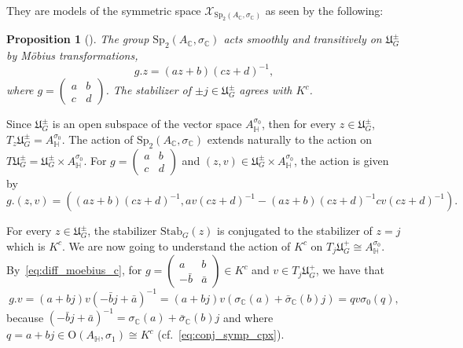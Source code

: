 \documentclass[oneside,11pt]{amsart}
\newtheorem{prop}[thm]{Proposition}
\theoremstyle{definition}
\theoremstyle{remark}
\numberwithin{thm}{section}
\numberwithin{equation}{section}
\begin{document}
\noindent They are models of the symmetric space  $\mathcal X_{\mathrm{Sp}_2(A_\mathbb{C},\sigma_\mathbb{C})}$ as seen by the following:

\begin{prop}[{\cite[Proposition~6.10]{ABRRW}}]
    The group $\mathrm{Sp}_2(A_\mathbb C,\sigma_\mathbb C)$ acts smoothly and transitively on $\mathfrak{U}_G^\pm$ by M\"obius transformations, 
    $$g.z=(az+b)(cz+d)^{-1},$$ 
    where $g=\begin{pmatrix}
        a & b \\
        c & d
    \end{pmatrix}$. The stabilizer of $\pm j\in\mathfrak{U}_G^\pm$ agrees with $K^c$.
\end{prop}

Since $\mathfrak{U}_G^\pm$ is an open subspace of the vector space $A_\mathbb{H}^{\sigma_0}$, then for every $z\in \mathfrak{U}_G^\pm$, $T_z\mathfrak{U}_G^\pm = A_\mathbb{H}^{\sigma_0}$.  The action of $\mathrm{Sp}_2(A_\mathbb C,\sigma_\mathbb C)$ extends naturally to the action on $T\mathfrak{U}_G^\pm=\mathfrak{U}_G^\pm\times A^{\sigma_0}_\mathbb H$. For $g=\begin{pmatrix}
        a & b \\
        c & d
    \end{pmatrix}$
and $(z,v)\in \mathfrak{U}_G^\pm\times A^{\sigma_0}_\mathbb H$, the action is given by 
\begin{equation}\label{eq:diff_moebius_c}
    g.(z,v)=\left((az+b)(cz+d)^{-1}, av(cz+d)^{-1}-(az+b)(cz+d)^{-1}cv(cz+d)^{-1}\right).    
\end{equation}

For every $z\in\mathfrak{U}_G^\pm$, the stabilizer $\mathrm{Stab}_{G}(z)$ is conjugated to the stabilizer of $z=j$ which is $K^c$. We are now going to understand the action of $K^c$ on $T_j\mathfrak{U}_G^+\cong A_\mathbb H^{\sigma_0}$. By~\eqref{eq:diff_moebius_c}, for $g=\begin{pmatrix}
    a & b \\
    -\bar b & \bar a
\end{pmatrix}\in K^c$ and $v\in T_j\mathfrak{U}_G^+$, we have that
$$g.v
=(a+bj)v(-\bar bj+\bar a)^{-1}
=(a+bj)v(\sigma_{\mathbb C}(a)+\bar\sigma_{\mathbb C}(b)j)=qv\sigma_0(q),$$
because $(-\bar bj+\bar a)^{-1}=\sigma_{\mathbb C}(a)+\bar\sigma_{\mathbb C}(b)j$ and where $q=a+bj\in\mathrm O(A_\mathbb H,\sigma_1)\cong K^c$ (cf.~\eqref{eq:conj_symp_cpx}). 
\end{document}
